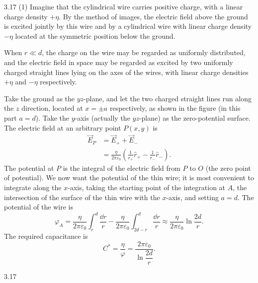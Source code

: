 \begin{solution}{3.17}
(1) Imagine that the cylindrical wire carries positive charge, with a linear charge density $+\eta$. By the method of images, the electric field above the ground is excited jointly by this wire and by a cylindrical wire with linear charge density $-\eta$ located at the symmetric position below the ground.

When $r\ll d$, the charge on the wire may be regarded as uniformly distributed, and the electric field in space may be regarded as excited by two uniformly charged straight lines lying on the axes of the wires, with linear charge densities $+\eta$ and $-\eta$ respectively.

Take the ground as the $yz$-plane, and let the two charged straight lines run along the $z$ direction, located at $x=\pm a$ respectively, as shown in the figure (in this part $a=d$). Take the $y$-axis (actually the $yz$-plane) as the zero-potential surface. The electric field at an arbitrary point $P(x,y)$ is
\begin{align*}
\vec{E}_P&=\vec{E}_++\vec{E}_-\\
&=\frac{\eta}{2\pi\varepsilon_0}\left(\frac{1}{r_+}\hat{r}_+-\frac{1}{r_-}\hat{r}_-\right).
\end{align*}
The potential at $P$ is the integral of the electric field from $P$ to $O$ (the zero point of potential). We now want the potential of the thin wire; it is most convenient to integrate along the $x$-axis, taking the starting point of the integration at $A$, the intersection of the surface of the thin wire with the $x$-axis, and setting $a=d$. The potential of the wire is
\[
\varphi_A=\frac{\eta}{2\pi\varepsilon_0}\int_r^d\frac{\dd r}{r}
-\frac{\eta}{2\pi\varepsilon_0}\int_{2d-r}^d\frac{\dd r}{r}
\approx\frac{\eta}{2\pi\varepsilon_0}\ln\frac{2d}{r}.
\]
The required capacitance is
\[
C^*=\frac{\eta}{\varphi}=\frac{2\pi\varepsilon_0}{\ln\dfrac{2d}{r}}.
\]

\begin{figbox}{3.17}
\end{figbox}


\end{solution}
